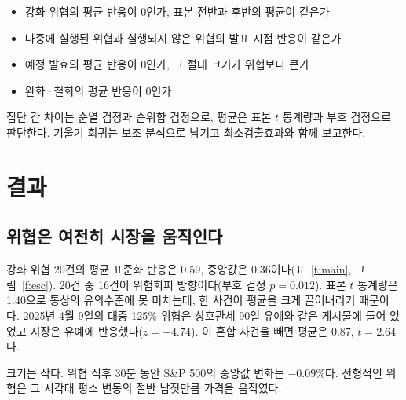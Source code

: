 \documentclass[11pt,a4paper]{article}
\begin{document}
\begin{itemize}[leftmargin=2.2em,itemsep=1pt,topsep=3pt]
\item[T1] 강화 위협의 평균 반응이 0인가, 표본 전반과 후반의 평균이 같은가
\item[T2] 나중에 실행된 위협과 실행되지 않은 위협의 발표 시점 반응이 같은가
\item[T3] 예정 발효의 평균 반응이 0인가, 그 절대 크기가 위협보다 큰가
\item[T4] 완화·철회의 평균 반응이 0인가
\end{itemize}

집단 간 차이는 순열 검정과 순위합 검정으로, 평균은 표본 $t$ 통계량과 부호 검정으로 판단한다. 기울기 회귀는 보조 분석으로 남기고 최소검출효과와 함께 보고한다.

\section{결과}

\subsection{위협은 여전히 시장을 움직인다}

강화 위협 20건의 평균 표준화 반응은 0.59, 중앙값은 0.36이다(표~\ref{t:main}, 그림~\ref{f:esc}). 20건 중 16건이 위험회피 방향이다(부호 검정 $p=0.012$). 표본 $t$ 통계량은 1.40으로 통상의 유의수준에 못 미치는데, 한 사건이 평균을 크게 끌어내리기 때문이다. 2025년 4월 9일의 대중 125\% 위협은 상호관세 90일 유예와 같은 게시물에 들어 있었고 시장은 유예에 반응했다($z=-4.74$). 이 혼합 사건을 빼면 평균은 0.87, $t=2.64$다.

크기는 작다. 위협 직후 30분 동안 S\&P 500의 중앙값 변화는 $-0.09$\%다. 전형적인 위협은 그 시각대 평소 변동의 절반 남짓만큼 가격을 움직였다.
\end{document}
